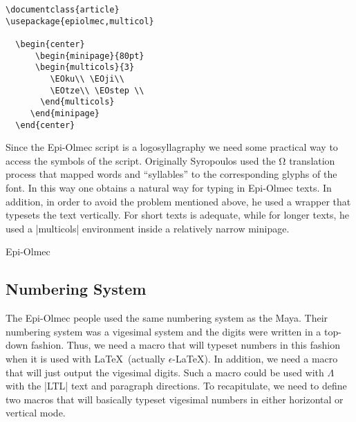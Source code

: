 \begin{verbatim}
\documentclass{article}
\usepackage{epiolmec,multicol}

  \begin{center}
      \begin{minipage}{80pt}
      \begin{multicols}{3}
         \EOku\\ \EOji\\  
         \EOtze\\ \EOstep \\
       \end{multicols}    
     \end{minipage}       
  \end{center}

\end{verbatim}

Since the Epi-Olmec script is a logosyllagraphy we
need some practical way to access the symbols of the
script. Originally Syropoulos used the Ω translation
process that mapped words and “syllables” to the
corresponding glyphs of the font. In this way one obtains
a natural way for typing in Epi-Olmec texts. In addition,
in order to avoid the problem mentioned above,
he used a wrapper that typesets the text vertically.
For short texts \cmd{\shortstacks} is adequate, while
for longer texts, he used a |multicols| environment
inside a relatively narrow minipage. 

\begin{scriptexample}{Epi-Olmec}
\bgroup
\HUGE
\centering
\EOpi   \EOofficerI \EOofficerII \EOofficerIII

\egroup
\end{scriptexample}

\subsection{Numbering System}

The Epi-Olmec people used the same numbering system  
 as the Maya. Their numbering system was a vigesimal system and
 the digits were written in a top-down fashion. Thus, we need a macro
 that will typeset numbers in this fashion when it is used with \LaTeX\
 (actually $\epsilon$-\LaTeX). In addition, we need a macro that will
 just output the vigesimal digits. Such a macro could be used with
 $\Lambda$ with the |LTL| text and paragraph directions. To recapitulate,
 we need to define two macros that will basically typeset vigesimal numbers
 in either horizontal or vertical mode.

